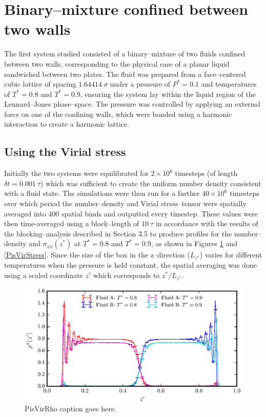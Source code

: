 \section{Binary--mixture confined between two walls}
The first system studied consisted of a binary--mixture of two fluids confined between two walls, corresponding to the physical case of a planar liquid sandwiched between two plates.
The fluid was prepared from a face--centered cubic lattice of spacing $1.64414\ \sigma$ under a pressure of $P^{*} = 0.1$ and temperatures of $T^{*} = 0.8$ and $T^{*} = 0.9$, ensuring the system lay within the liquid region of the Lennard--Jones phase--space.\cite{Smit}
The pressure was controlled by applying an external force on one of the confining walls, which were bonded using a harmonic interaction to create a harmonic lattice.

\subsection{Using the Virial stress}\label{VirialStressPiston}
Initially the two systems were equilibrated for $2 \times 10^{6}$ timesteps (of length $\delta t = 0.001\ \tau$) which was sufficient to create the uniform number density consistent with a fluid state.
The simulations were then run for a further $40 \times 10^{6}$ timesteps over which period the number--density and Virial stress--tensor were spatially averaged into 400 spatial binds and outputted every timestep.
These values were then time-averaged using a block--length of $10\ \tau$ in accordance with the results of the blocking--analysis described in Section 3.5 to produce profiles for the number--density and $\sigma_{xx}(z^{*})$ at $T^{*} = 0.8$ and $T^{*} = 0.9$, as shown in Figures \ref{PisVirRho} and \ref{PisVirStress}. 
Since the size of the box in the z--direction ($L_{z^{*}}$) varies for different temperatures when the pressure is held constant, the spatial averaging was done using a scaled coordinate $z'$ which corresponds to $z^{*} / L_{z^{*}}$.

\FloatBarrier
\begin{figure}[h]
\centering
\includegraphics[scale=0.8]{PisVirRho}
\caption{PisVirRho caption goes here.}
\label{PisVirRho}
\end{figure}

